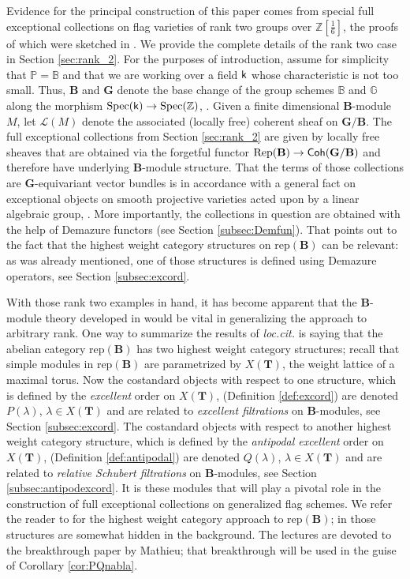 \documentclass[sn-mathphys-num]{sn-jnl}%
\newcommand{\Ll}{\mathcal L}
\newcommand{\rep}{{\mathrm{rep}}}
\newcommand{\Rep}{{\mathrm{Rep}}}
\newcommand*{\Coh}{\mathop{\sf {Coh}}\nolimits}
\newcommand{\sk}{{\sf k}}
\newcommand{\Gm}{\mathbb G}
\newcommand{\Bm}{\mathbb B}
\newcommand{\Pm}{\mathbb P}
\newcommand{\bg}{\mathbf G}
\newcommand{\fb}{\mathbf B}
\newcommand{\bt}{\mathbf T}
\theoremstyle{definition}
\begin{document}
Evidence for the principal construction of this paper comes from special full exceptional collections on flag varieties of rank two groups over ${\mathbb Z}[\frac{1}{6}]$, the proofs of which were sketched in \cite{Sam}. We provide the complete details of the rank two case in Section \ref{sec:rank_2}. 
For the purposes of introduction, assume for simplicity that $\Pm=\Bm$ and that
we are working over a field $\sk$  whose characteristic  is not too small.
Thus, $\fb$ and $ \bg$ denote the base change of the group schemes $\Bm$ and $\Gm$ along the morphism ${\rm Spec}(\sk)\rightarrow {\rm Spec}(\mathbb Z)$, \cite[Section 2.6]{Donkin2}. 
Given a finite dimensional $\fb$-module $M$, let $\Ll(M)$ denote the associated (locally free) coherent sheaf on $ \bg/ \fb$. 
The full exceptional collections from Section \ref{sec:rank_2} are given by locally free sheaves that are obtained via the forgetful functor $\Rep( \fb)\rightarrow {\Coh}({ \bg/\fb})$ and therefore have underlying $\fb$-module structure. That the terms of those collections are $\bg$-equivariant vector bundles is in accordance with a general fact on exceptional objects on smooth projective varieties acted upon by a linear algebraic group, \cite[Lemma 2.2]{Polishchuk}. More importantly, the collections in question are obtained with the help of Demazure functors (see Section \ref{subsec:Demfun}). That points out to the fact that the highest weight category structures on $\rep(\fb)$ can be relevant: as was already mentioned, one of those structures is defined using Demazure operators, see Section \ref{subsec:excord}. 

With those rank two examples in hand, it has become apparent that the $\fb$-module theory developed in \cite{WvdK} would be vital in generalizing the approach to arbitrary rank. 
One way to summarize the results of {\it loc.cit.} is saying that the abelian category $\rep( \fb)$ has two highest weight category structures; recall that simple modules in $\rep(\fb)$ are parametrized by $X( \bt)$, the weight lattice of a maximal torus. 
Now the costandard objects with respect to one structure, which is defined by the {\it excellent} order on $X( \bt)$, (Definition \ref{def:excord}) are denoted $P(\lambda)$, $\lambda \in X( \bt)$ and are related to {\it excellent filtrations} on $\fb$-modules, see Section \ref{subsec:excord}.  
The costandard objects with respect to another highest weight category structure, which is defined by the {\it antipodal excellent} order on  $X( \bt)$, (Definition \ref{def:antipodal}) are denoted $Q(\lambda)$, $\lambda \in X( \bt)$ and are related to {\it relative 
Schubert filtrations} on $\fb$-modules, see Section \ref{subsec:antipodexcord}. It is these modules that will play a pivotal role in the construction of full exceptional collections on generalized flag schemes. 
We refer the reader to \cite{WvdK} for the highest weight category approach to $\rep( \fb)$; in \cite{WvdKTata} those structures are somewhat hidden in the background. The lectures \cite{WvdKTata} are devoted to the breakthrough paper \cite{MathG} by Mathieu; that breakthrough will be used in the guise of Corollary \ref{cor:PQnabla}.
\end{document}
